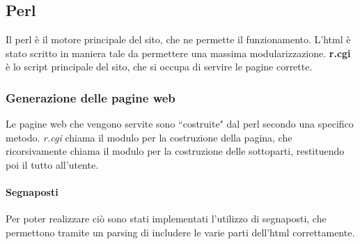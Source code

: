 \subsection{Perl}
Il perl \`e il motore principale del sito, che ne permette il funzionamento. L'html \`e stato scritto in maniera tale da permettere una massima modularizzazione. \textbf{r.cgi} \`e lo script principale del sito, che si occupa di servire le pagine corrette.
\subsubsection{Generazione delle pagine web}
Le pagine web che vengono servite sono ``costruite" dal perl secondo una specifico metodo. \textit{r.cgi} chiama il modulo per la costruzione della pagina, che ricorsivamente chiama il modulo per la costruzione delle sottoparti, restituendo poi il tutto all'utente.
\paragraph*{Segnaposti} Per poter realizzare ci\`o sono stati implementati l'utilizzo di segnaposti, che permettono tramite un parsing di includere le varie parti dell'html correttamente.

